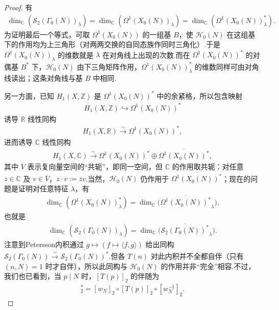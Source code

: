 \begin{proof}

有
\begin{align*}
\dim_{\mathbb C}(\mathcal S_2(\Gamma_0(N))_\lambda)
=\dim_{\mathbb C}(\Omega^1(X_0(N))_\lambda)
=\dim_{\mathbb C}(\Omega^1(X_0(N))_\lambda^*).
\end{align*}
为证明最后一个等式，可取 $\Omega^1(X_0(N))$ 的一组基 $B$，使 $\mathcal H_0(N)$ 在这组基下的作用均为上三角形（对两两交换的自同态族作同时三角化）.于是 $\Omega^1(X_0(N))_\lambda$ 的维数就是 $\lambda$ 在对角线上出现的次数.而在 $\Omega^1(X_0(N))^*$ 的对偶基 $B^*$ 下，$\mathcal H_0(N)$ 由下三角矩阵作用，$\Omega^1(X_0(N))_\lambda^*$ 的维数同样可由对角线读出；这条对角线与基 $B$ 中相同.



另一方面，已知 $H_1(X,\mathbb Z)$ 是 $\Omega^1(X_0(N))^*$ 中的余紧格，所以包含映射
\begin{align*}
H_1(X,\mathbb Z)\hookrightarrow\Omega^1(X_0(N))^*
\end{align*}
诱导 $\mathbb R$ 线性同构
\begin{align*}
H_1(X,\mathbb R)\xrightarrow{\sim}\Omega^1(X_0(N))^*,
\end{align*}
进而诱导 $\mathbb C$ 线性同构
\begin{align*}
H_1(X,\mathbb C)\xrightarrow{\sim}\Omega^1(X_0(N))^*\oplus\overline{\Omega^1(X_0(N))^*},
\end{align*}
其中 $\overline V$ 表示复向量空间的``共轭''，即同一空间，但 $\mathbb C$ 的作用取共轭：对任意 $z\in\mathbb C$ 及 $v\in\overline V$，$z\cdot v:=\overline z v$.当然，$\mathcal H_0(N)$ 仍作用于 $\overline{\Omega^1(X_0(N))^*}$；现在的问题是证明对任意特征 $\lambda$，有
\begin{align*}
\dim_{\mathbb C}(\Omega^1(X_0(N))_\lambda^*)
=\dim_{\mathbb C}\bigl(\overline{\Omega^1(X_0(N))^*}_\lambda\bigr),
\end{align*}
也就是
\begin{align*}
\dim_{\mathbb C}(\mathcal S_2(\Gamma_0(N))_\lambda)
=\dim_{\mathbb C}\bigl(\overline{\mathcal S_2(\Gamma_0(N))^*}_\lambda\bigr).
\end{align*}
注意到Petersson内积通过 $g\mapsto(f\mapsto\langle f,g\rangle)$ 给出同构 $\mathcal S_2(\Gamma_0(N))\xrightarrow{\sim}\overline{\mathcal S_2(\Gamma_0(N))^*}$.但各 $T(n)$ 对此内积并不全都自伴（只有 $(n,N)=1$ 时才自伴），所以此同构与 $\mathcal H_0(N)$ 的作用并非``完全''相容.不过，我们也已看到，当 $p\mid N$ 时，$[T(p)]_2$ 的伴随为
\begin{align*}
[T(p)]_2^*=[w_N]_2\circ[T(p)]_2\circ[w_N^{-1}]_2.

\end{align*}
\end{proof}
